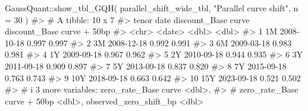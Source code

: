 \documentclass[
  letterpaper,
  DIV=11,
  numbers=noendperiod]{scrreprt}
\newenvironment{Shaded}{\begin{snugshade}}{\end{snugshade}}
\newcommand{\AttributeTok}[1]{\textcolor[rgb]{0.40,0.45,0.13}{#1}}
\newcommand{\CommentTok}[1]{\textcolor[rgb]{0.37,0.37,0.37}{#1}}
\newcommand{\DecValTok}[1]{\textcolor[rgb]{0.68,0.00,0.00}{#1}}
\newcommand{\FunctionTok}[1]{\textcolor[rgb]{0.28,0.35,0.67}{#1}}
\newcommand{\NormalTok}[1]{\textcolor[rgb]{0.00,0.23,0.31}{#1}}
\newcommand{\SpecialCharTok}[1]{\textcolor[rgb]{0.37,0.37,0.37}{#1}}
\newcommand{\StringTok}[1]{\textcolor[rgb]{0.13,0.47,0.30}{#1}}
\begin{document}
\begin{Shaded}
\begin{Highlighting}[]
\NormalTok{GaussQuant}\SpecialCharTok{::}\FunctionTok{show\_tbl\_GQH}\NormalTok{(}
\NormalTok{  parallel\_shift\_wide\_tbl,}
  \StringTok{"Parallel curve shift"}\NormalTok{,}
  \AttributeTok{n =} \DecValTok{30}
\NormalTok{)}
\CommentTok{\#\textgreater{} \# A tibble: 10 x 7}
\CommentTok{\#\textgreater{}    tenor date       \textasciigrave{}discount\_Base curve\textasciigrave{} \textasciigrave{}discount\_Base curve + 50bp\textasciigrave{}}
\CommentTok{\#\textgreater{}    \textless{}chr\textgreater{} \textless{}date\textgreater{}                     \textless{}dbl\textgreater{}                        \textless{}dbl\textgreater{}}
\CommentTok{\#\textgreater{}  1 1M    2008{-}10{-}18                 0.997                        0.997}
\CommentTok{\#\textgreater{}  2 3M    2008{-}12{-}18                 0.992                        0.991}
\CommentTok{\#\textgreater{}  3 6M    2009{-}03{-}18                 0.983                        0.981}
\CommentTok{\#\textgreater{}  4 1Y    2009{-}09{-}18                 0.967                        0.962}
\CommentTok{\#\textgreater{}  5 2Y    2010{-}09{-}18                 0.944                        0.935}
\CommentTok{\#\textgreater{}  6 3Y    2011{-}09{-}18                 0.909                        0.897}
\CommentTok{\#\textgreater{}  7 5Y    2013{-}09{-}18                 0.837                        0.820}
\CommentTok{\#\textgreater{}  8 7Y    2015{-}09{-}18                 0.763                        0.743}
\CommentTok{\#\textgreater{}  9 10Y   2018{-}09{-}18                 0.663                        0.642}
\CommentTok{\#\textgreater{} 10 15Y   2023{-}09{-}18                 0.521                        0.502}
\CommentTok{\#\textgreater{} \# i 3 more variables: \textasciigrave{}zero\_rate\_Base curve\textasciigrave{} \textless{}dbl\textgreater{},}
\CommentTok{\#\textgreater{} \#   \textasciigrave{}zero\_rate\_Base curve + 50bp\textasciigrave{} \textless{}dbl\textgreater{}, observed\_zero\_shift\_bp \textless{}dbl\textgreater{}}
\end{Highlighting}
\end{Shaded}
\end{document}
